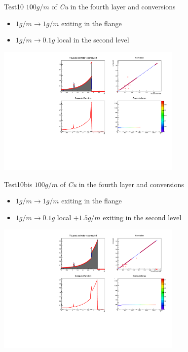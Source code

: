 \documentclass[pdftex, 11pt]{beamer}
\begin{document}
\begin{frame}
  \begin{block}{Test10}
    \alert{$100 g/m$} of \emph{Cu} in the fourth layer and conversions
    \begin{itemize}
    \item \alert{$1g/m\to 1g/m$} exiting in the flange
    \item \alert{$1g/m\to 0.1g$} local in the second level
    \end{itemize}
  \end{block}
  \begin{center}
    \includegraphics[width=9cm]{img/test10.pdf}
  \end{center}
\end{frame}

\begin{frame}
  \begin{block}{Test10bis}
    \alert{$100 g/m$} of \emph{Cu} in the fourth layer and conversions
    \begin{itemize}
    \item \alert{$1g/m\to 1g/m$} exiting in the flange
    \item \alert{$1g/m\to 0.1g$} local \alert{$+ 1.5g/m$} exiting in the second level
    \end{itemize}
  \end{block}
  \begin{center}
    \includegraphics[width=9cm]{img/test10bis.pdf}
  \end{center}
\end{frame}
\end{document}
